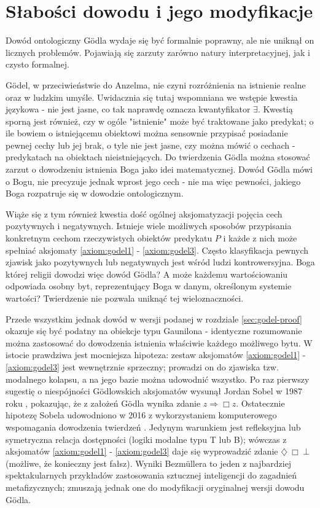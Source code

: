 \documentclass{article}
\begin{document}
\section{Słabości dowodu i jego modyfikacje} \label{sec:anderson-proof}
Dowód ontologiczny Gödla wydaje się być formalnie poprawny, ale nie uniknął on licznych problemów. Pojawiają się zarzuty zarówno natury interpretacyjnej, jak i czysto formalnej. 

Gödel, w przeciwieństwie do Anzelma, nie czyni rozróżnienia na istnienie realne oraz w ludzkim umyśle. Uwidacznia się tutaj wspomniana we wstępie kwestia językowa - nie jest jasne, co tak naprawdę oznacza kwantyfikator $\exists$. Kwestią sporną jest również, czy w ogóle "istnienie" może być traktowane jako predykat; o ile bowiem o istniejącemu obiektowi można sensownie przypisać posiadanie pewnej cechy lub jej brak, o tyle nie jest jasne, czy można mówić o cechach - predykatach na obiektach nieistniejących. Do twierdzenia Gödla można stosować zarzut o dowodzeniu istnienia Boga jako idei matematycznej. Dowód Gödla mówi o Bogu, nie precyzuje jednak wprost jego cech - nie ma więc pewności, jakiego Boga rozpatruje się w dowodzie ontologicznym. 

Wiąże się z tym również kwestia dość ogólnej aksjomatyzacji pojęcia cech pozytywnych i negatywnych. Istnieje wiele możliwych sposobów przypisania konkretnym cechom rzeczywistych obiektów predykatu $P$ i każde z nich może spełniać aksjomaty \ref{axiom:godel1} - \ref{axiom:godel3}. Często klasyfikacja pewnych zjawisk jako pozytywnych lub negatywnych jest wśród ludzi kontrowersyjna. Boga której religii dowodzi więc dowód Gödla? A może każdemu wartościowaniu odpowiada osobny byt, reprezentujący Boga w danym, określonym systemie wartości? Twierdzenie nie pozwala uniknąć tej wieloznaczności. 

Przede wszystkim jednak dowód w wersji podanej w rozdziale \ref{sec:godel-proof} okazuje się być podatny na obiekcje typu Gaunilona - identyczne rozumowanie można zastosować do dowodzenia istnienia właściwie każdego możliwego bytu. W istocie prawdziwa jest mocniejsza hipoteza: zestaw aksjomatów \ref{axiom:godel1} - \ref{axiom:godel3} jest wewnętrznie sprzeczny; prowadzi on do zjawiska tzw. modalnego kolapsu, a na jego bazie można udowodnić wszystko. Po raz pierwszy sugestię o niespójności Gödlowskich aksjomatów wysunął Jordan Sobel w 1987 roku \cite{sobel1987}, pokazując, że z założeń Gödla wynika zdanie $z\Rightarrow\Box z$. Ostatecznie hipotezę Sobela udowodniono w 2016 z wykorzystaniem komputerowego wspomagania dowodzenia twierdzeń \cite{Benzmuller2016}. Jedynym warunkiem jest refleksyjna lub symetryczna relacja dostępności (logiki modalne typu T lub B); wówczas z aksjomatów  \ref{axiom:godel1} - \ref{axiom:godel3} daje się wyprowadzić zdanie $\diamondsuit\ \Box\ \bot$ (możliwe, że konieczny jest fałsz). Wyniki Bezmüllera to jeden z najbardziej spektakularnych przykładów zastosowania sztucznej inteligencji do zagadnień metafizycznych; zmuszają jednak one do modyfikacji oryginalnej wersji dowodu Gödla. 
\end{document}
